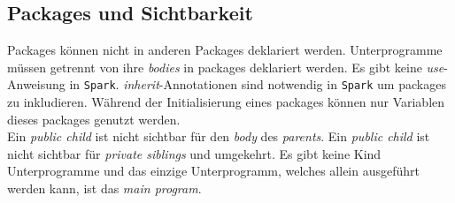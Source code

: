 \subsection{Packages und Sichtbarkeit}
\label{subsec:PackagesUndSichtbarkeit}
Packages können nicht in anderen Packages deklariert werden. Unterprogramme müssen getrennt von ihre \textit{bodies} in packages deklariert werden. Es gibt keine \textit{use}-Anweisung in \texttt{Spark}. \textit{inherit}-Annotationen sind notwendig in \texttt{Spark} um packages zu inkludieren. Während der Initialisierung eines packages können nur Variablen dieses packages genutzt werden.\\
Ein \textit{public child} ist nicht sichtbar für den \textit{body} des \textit{parents}. Ein \textit{public child} ist nicht sichtbar für \textit{private siblings} und umgekehrt. Es gibt keine Kind Unterprogramme und das einzige Unterprogramm, welches allein ausgeführt werden kann, ist das \textit{main program}.
